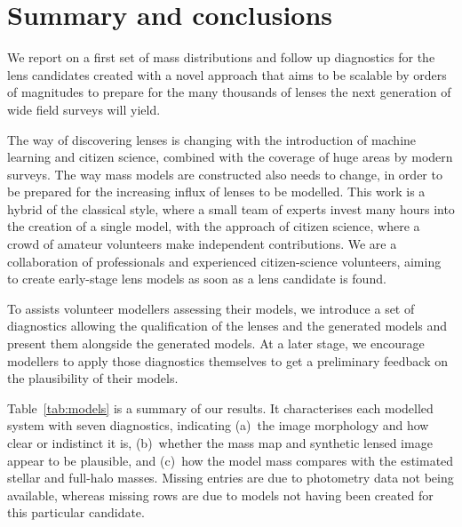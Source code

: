 \section{Summary and conclusions}\label{sec:summary}


We report on a first set of mass distributions and follow up diagnostics for 
the {\SW} lens candidates created with a novel approach that aims to be scalable 
by orders of magnitudes to prepare for the many thousands of lenses the next 
generation of wide field surveys will yield.

The way of discovering lenses is changing with the introduction of
machine learning and citizen science, combined with the coverage of
huge areas by modern surveys.  The way mass models are constructed also needs to
change, in order to be prepared for the increasing influx of lenses to
be modelled.  This work is a hybrid of the classical style, where a
small team of experts invest many hours into the creation of a single
model, with the approach of citizen science, where a crowd of amateur
volunteers make independent contributions.  We are a collaboration of
professionals and experienced citizen-science volunteers, aiming to
create early-stage lens models as soon as a lens candidate is found.

To assists volunteer modellers assessing their models, we introduce a
set of diagnostics allowing the qualification of the lenses and the
generated models and present them alongside the generated models. At a
later stage, we encourage modellers to apply those diagnostics
themselves to get a preliminary feedback on the plausibility of their
models.

Table~\ref{tab:models} is a summary of our results.  It characterises
each modelled system with seven diagnostics, indicating (a)~the image
morphology and how clear or indistinct it is, (b)~whether the mass map
and synthetic lensed image appear to be plausible, and (c)~how the
model mass compares with the estimated stellar and full-halo masses.
Missing entries are due to photometry data not being available, whereas
missing rows are due to models not having been created for this particular
candidate.

